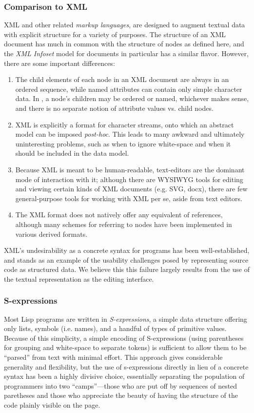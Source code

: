 \subsubsection{Comparison to XML}
XML and other related \emph{markup languages}, are designed to augment textual data with explicit structure for a variety of purposes. The structure of an XML document has much in common with the structure of nodes as defined here, and the \emph{XML Infoset}\cite{infoset} model for documents in particular has a similar flavor. However, there are some important differences:
\begin{enumerate}
\item The child elements of each node in an XML document are always in an ordered sequence, while named attributes can contain only simple character data. In \Meta, a node's children may be ordered or named, whichever makes sense, and there is no separate notion of attribute values vs. child nodes.
\item XML is explicitly a format for character streams, onto which an abstract model can be imposed \textit{post-hoc}. This leads to many awkward and ultimately uninteresting problems, such as when to ignore white-space and when it should be included in the data model.
\item Because XML is meant to be human-readable, text-editors are the dominant mode of interaction with it; although there are WYSIWYG tools for editing and viewing certain kinds of XML documents (e.g. SVG\cite{svg}, docx\cite{openoffice}), there are few general-purpose tools for working with XML per se, aside from text editors.
\item The XML format does not natively offer any equivalent of references, although many schemes for referring to nodes have been implemented in various derived formats.
\end{enumerate}

XML's undesirability as a concrete syntax for programs has been well-established, and stands as an example of the usability challenges posed by representing source code as structured data\cite{?}. We believe this this failure largely results from the use of the textual representation as the editing interface.

\subsubsection{S-expressions}
Most Lisp programs are written in \emph{S-expressions}, a simple data structure offering only lists, symbols (i.e. names), and a handful of types of primitive values. Because of this simplicity, a simple encoding of S-expressions (using parentheses for grouping and white-space to separate tokens) is sufficient to allow them to be ``parsed'' from text with minimal effort. This approach gives considerable generality and flexibility, but the use of s-expressions directly in lieu of a concrete syntax has been a highly divisive choice, essentially separating the population of programmers into two ``camps''---those who are put off by sequences of nested paretheses and those who appreciate the beauty of having the structure of the code plainly visible on the page\cite{?}.


